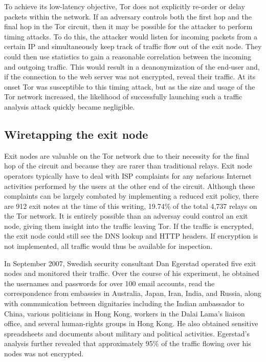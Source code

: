 \documentclass[journal]{IEEEtran}
\begin{document}
To achieve its low-latency objective, Tor does not explicitly re-order or delay packets within the network.\cite{McCoy2008} If an adversary controls both the first hop and the final hop in the Tor circuit, then it may be possible for the attacker to perform timing attacks. To do this, the attacker would listen for incoming packets from a certain IP and simultaneously keep track of traffic flow out of the exit node. They could then use statistics to gain a reasonable correlation between the incoming and outgoing traffic. This would result in a deanonymization of the end-user and, if the connection to the web server was not encrypted, reveal their traffic. At its onset Tor was susceptible to this timing attack, but as the size and usage of the Tor network increased, the likelihood of successfully launching such a traffic analysis attack quickly became negligible.\cite{Xin2009}

\subsection{Wiretapping the exit node}

Exit nodes are valuable on the Tor network due to their necessity for the final hop of the circuit and because they are rarer than traditional relays. Exit node operators typically have to deal with ISP complaints for any nefarious Internet activities performed by the users at the other end of the circuit. Although these complaints can be largely combated by implementing a reduced exit policy, there are 912 exit notes at the time of this writing, 19.74\% of the total 4,737 relays on the Tor network. It is entirely possible than an adversay could control an exit node, giving them insight into the traffic leaving Tor. If the traffic is encrypted, the exit node could still see the DNS lookup and HTTP headers. If encryption is not implemented, all traffic would thus be available for inspection.

In September 2007, Swedish security consultant Dan Egerstad operated five exit nodes and monitored their traffic. Over the course of his experiment, he obtained the usernames and passwords for over 100 email accounts, read the correspondence from embassies in Australia, Japan, Iran, India, and Russia, along with communication between dignitaries including the Indian ambassador to China, various politicians in Hong Kong, workers in the Dalai Lama's liaison office, and several human-rights groups in Hong Kong. He also obtained sensitive spreadsheets and documents about military and political activities. Egerstad's analysis further revealed that approximately 95\% of the traffic flowing over his nodes was not encrypted.\cite{Wired2007}
\end{document}
